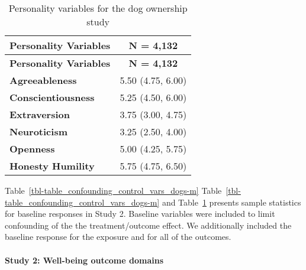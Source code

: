 \documentclass[
  singlecolumn,
  9pt]{article}
\let\oldparagraph\paragraph
\renewcommand{\paragraph}[1]{\oldparagraph{#1}\mbox{}}
\begin{document}
\begin{longtable}[]{@{}lc@{}}
\caption{Personality variables for the dog ownership
study}\label{tbl-table_baseline_personality_dogs-m}\tabularnewline
\toprule\noalign{}
\textbf{Personality Variables} & \textbf{N = 4,132} \\
\midrule\noalign{}
\endfirsthead
\toprule\noalign{}
\textbf{Personality Variables} & \textbf{N = 4,132} \\
\midrule\noalign{}
\endhead
\bottomrule\noalign{}
\endlastfoot
\textbf{Agreeableness} & 5.50 (4.75, 6.00) \\
\textbf{Conscientiousness} & 5.25 (4.50, 6.00) \\
\textbf{Extraversion} & 3.75 (3.00, 4.75) \\
\textbf{Neuroticism} & 3.25 (2.50, 4.00) \\
\textbf{Openness} & 5.00 (4.25, 5.75) \\
\textbf{Honesty Humility} & 5.75 (4.75, 6.50) \\
\end{longtable}

Table~\ref{tbl-table_confounding_control_vars_dogs-m}
Table~\ref{tbl-table_confounding_control_vars_dogs-m} and
Table~\ref{tbl-table_baseline_personality_dogs-m} presents sample
statistics for baseline responses in Study 2. Baseline variables were
included to limit confounding of the the treatment/outcome effect. We
additionally included the baseline response for the exposure and for all
of the outcomes.

\newpage{}

\paragraph{Study 2: Well-being outcome
domains}\label{study-2-well-being-outcome-domains}
\end{document}
